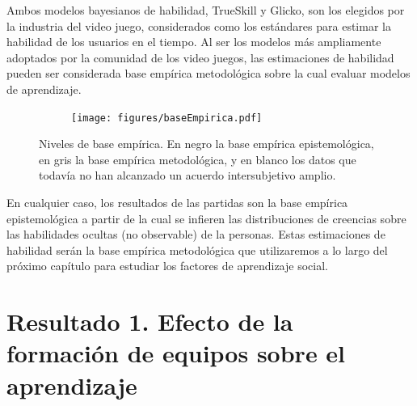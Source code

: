 \documentclass[a4paper,11pt]{book}
\theoremstyle{definition}
\begin{document}
Ambos modelos bayesianos de habilidad, TrueSkill y Glicko, son los elegidos por la industria del video juego, considerados como los est\'andares para estimar la habilidad de los usuarios en el tiempo.
%
Al ser los modelos m\'as ampliamente adoptados por la comunidad de los video juegos, las estimaciones de habilidad pueden ser considerada base emp\'irica metodol\'ogica sobre la cual evaluar modelos de aprendizaje.
\begin{figure}[ht!]
    \centering
    \begin{subfigure}[b]{0.45\textwidth}
    \texttt{[image: figures/baseEmpirica.pdf]}
    \end{subfigure}
    \caption{Niveles de base emp\'irica. En negro la base emp\'irica epistemol\'ogica, en gris la base emp\'irica metodol\'ogica, y en blanco los datos que todav\'ia no han alcanzado un acuerdo intersubjetivo amplio.}
\end{figure}
%
En cualquier caso, los resultados de las partidas son la base emp\'irica epistemol\'ogica a partir de la cual se infieren las distribuciones de creencias sobre las habilidades ocultas (no observable) de la personas.
%
Estas estimaciones de habilidad ser\'an la base emp\'irica metodol\'ogica que utilizaremos a lo largo del pr\'oximo cap\'itulo para estudiar los factores de aprendizaje social.
























\chapter{Resultado 1. Efecto de la formaci\'on de equipos sobre el aprendizaje}\label{ch:team}
\end{document}
